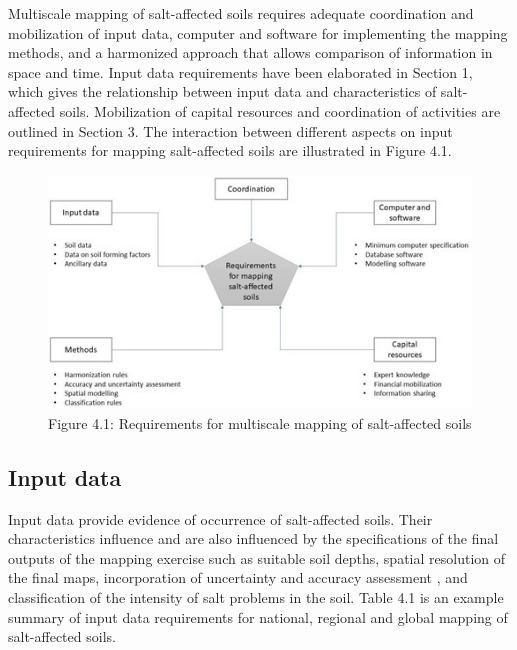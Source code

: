 \documentclass[
  10pt,
  b5paper,
]{book}
\begin{document}
Multiscale mapping of salt-affected soils requires adequate coordination and mobilization of input data, computer and software for implementing the mapping methods, and a harmonized approach that allows comparison of information in space and time. Input data requirements have been elaborated in Section 1, which gives the relationship between input data and characteristics of salt-affected soils. Mobilization of capital resources and coordination of activities are outlined in Section 3. The interaction between different aspects on input requirements for mapping salt-affected soils are illustrated in Figure 4.1.

\begin{figure}
\centering
\includegraphics{figures/images/Figure4.1.jpg}
\caption{Figure 4.1: Requirements for multiscale mapping of salt-affected soils}
\end{figure}

\hypertarget{input-data}{%
\subsection{Input data}\label{input-data}}

Input data provide evidence of occurrence of salt-affected soils. Their characteristics influence and are also influenced by the specifications of the final outputs of the mapping exercise such as suitable soil depths, spatial resolution of the final maps, incorporation of uncertainty and accuracy assessment , and classification of the intensity of salt problems in the soil. Table 4.1 is an example summary of input data requirements for national, regional and global mapping of salt-affected soils.
\end{document}
